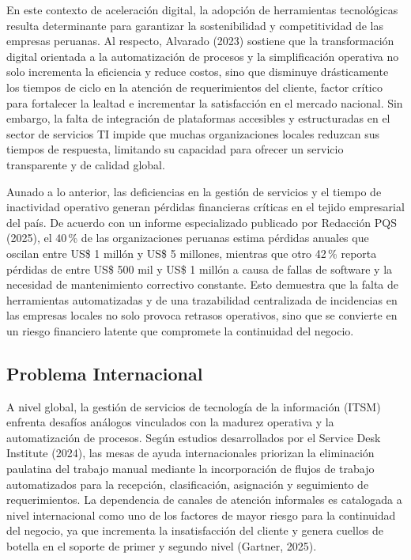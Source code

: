 En este contexto de aceleración digital, la adopción de herramientas tecnológicas resulta determinante para garantizar la sostenibilidad y competitividad de las empresas peruanas. Al respecto, Alvarado (2023) sostiene que la transformación digital orientada a la automatización de procesos y la simplificación operativa no solo incrementa la eficiencia y reduce costos, sino que disminuye drásticamente los tiempos de ciclo en la atención de requerimientos del cliente, factor crítico para fortalecer la lealtad e incrementar la satisfacción en el mercado nacional. Sin embargo, la falta de integración de plataformas accesibles y estructuradas en el sector de servicios TI impide que muchas organizaciones locales reduzcan sus tiempos de respuesta, limitando su capacidad para ofrecer un servicio transparente y de calidad global.

Aunado a lo anterior, las deficiencias en la gestión de servicios y el tiempo de inactividad operativo generan pérdidas financieras críticas en el tejido empresarial del país. De acuerdo con un informe especializado publicado por Redacción PQS (2025), el 40\,\% de las organizaciones peruanas estima pérdidas anuales que oscilan entre US\$ 1 millón y US\$ 5 millones, mientras que otro 42\,\% reporta pérdidas de entre US\$ 500 mil y US\$ 1 millón a causa de fallas de software y la necesidad de mantenimiento correctivo constante. Esto demuestra que la falta de herramientas automatizadas y de una trazabilidad centralizada de incidencias en las empresas locales no solo provoca retrasos operativos, sino que se convierte en un riesgo financiero latente que compromete la continuidad del negocio.

\subsection{Problema Internacional}

A nivel global, la gestión de servicios de tecnología de la información (ITSM) enfrenta desafíos análogos vinculados con la madurez operativa y la automatización de procesos. Según estudios desarrollados por el Service Desk Institute (2024), las mesas de ayuda internacionales priorizan la eliminación paulatina del trabajo manual mediante la incorporación de flujos de trabajo automatizados para la recepción, clasificación, asignación y seguimiento de requerimientos. La dependencia de canales de atención informales es catalogada a nivel internacional como uno de los factores de mayor riesgo para la continuidad del negocio, ya que incrementa la insatisfacción del cliente y genera cuellos de botella en el soporte de primer y segundo nivel (Gartner, 2025).

